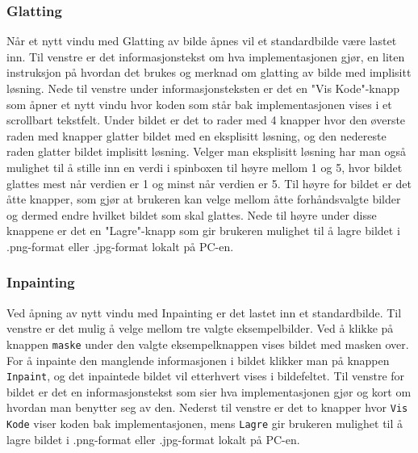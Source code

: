 \newpage

\subsubsection{Glatting}
Når et nytt vindu med Glatting av bilde åpnes vil et standardbilde være lastet inn. Til venstre er det informasjonstekst om hva implementasjonen gjør, en liten instruksjon på hvordan det brukes og merknad om glatting av bilde med implisitt løsning. Nede til venstre under informasjonsteksten er det en "Vis Kode"-knapp som åpner et nytt vindu hvor koden som står bak implementasjonen vises i et scrollbart tekstfelt. Under bildet er det to rader med 4 knapper hvor den øverste raden med knapper glatter bildet med en eksplisitt løsning, og den nedereste raden glatter bildet implisitt løsning. Velger man eksplisitt løsning har man også mulighet til å stille inn en verdi i spinboxen til høyre mellom 1 og 5, hvor bildet glattes mest når verdien er 1 og minst når verdien er 5. Til høyre for bildet er det åtte knapper, som gjør at brukeren kan velge mellom åtte forhåndsvalgte bilder og dermed endre hvilket bildet som skal glattes. Nede til høyre under disse knappene er det en "Lagre"-knapp som gir brukeren mulighet til å lagre bildet i .png-format eller .jpg-format lokalt på PC-en. 

\subsubsection{Inpainting}
Ved åpning av nytt vindu med Inpainting er det lastet inn et standardbilde. Til venstre er det mulig å velge mellom tre valgte eksempelbilder. Ved å klikke på knappen \texttt{maske} under den valgte eksempelknappen vises bildet med masken over. For å inpainte den manglende informasjonen i bildet klikker man på knappen \texttt{Inpaint}, og det inpaintede bildet vil etterhvert vises i bildefeltet. Til venstre for bildet er det en informasjonstekst som sier hva implementasjonen gjør og kort om hvordan man benytter seg av den. Nederst til venstre er det to knapper hvor \texttt{Vis Kode} viser koden bak implementasjonen, mens \texttt{Lagre} gir brukeren mulighet til å lagre bildet i .png-format eller .jpg-format lokalt på PC-en.

